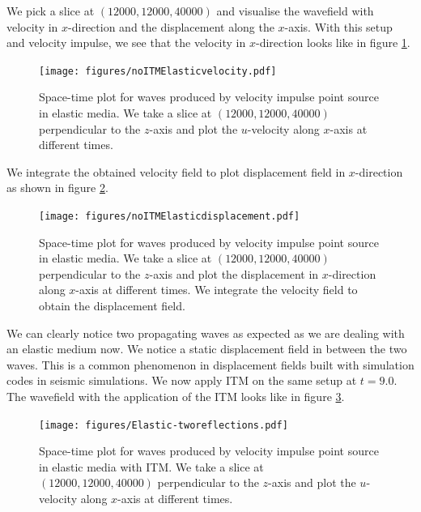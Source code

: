 We pick a slice at $\left(12000,12000,40000\right)$ and visualise the wavefield with velocity in $x$-direction and the displacement along the $x$-axis. With this setup and velocity impulse, 
we see that the velocity in $x$-direction looks like in figure \ref{fig:space-timeplot-elasticnoITM}.

\begin{figure}[htpb]
    \centering
    \texttt{[image: figures/noITMElasticvelocity.pdf]}
    \caption{Space-time plot for waves produced by velocity impulse point source in elastic media. We take a slice at $\left(12000,12000,40000\right)$ perpendicular to the $z$-axis
    and plot the $u$-velocity along $x$-axis at different times.}
    \label{fig:space-timeplot-elasticnoITM}
\end{figure}

We integrate the obtained velocity field to plot displacement field in $x$-direction as shown in figure \ref{fig:space-timeplot-elasticnoITMdisplacement}.

\begin{figure}[htpb]
    \centering
    \texttt{[image: figures/noITMElasticdisplacement.pdf]}
    \caption{Space-time plot for waves produced by velocity impulse point source in elastic media. We take a slice at $\left(12000,12000,40000\right)$ perpendicular to the $z$-axis
    and plot the displacement in $x$-direction along $x$-axis at different times. We integrate the velocity field to obtain the displacement field.}
    \label{fig:space-timeplot-elasticnoITMdisplacement}
\end{figure}

We can clearly notice two propagating waves as expected as we are dealing with an elastic medium now. We notice a static displacement field in between the two waves.
This is a common phenomenon in displacement fields built with simulation codes in seismic simulations. 
We now apply \ac{ITM} on the same setup at $t=9.0$. The wavefield with the application of the \ac{ITM} looks like in figure \ref{fig:space-timeplot-elasticITM}.

\begin{figure}[htpb]
    \centering
    \texttt{[image: figures/Elastic-tworeflections.pdf]}
    \caption{Space-time plot for waves produced by velocity impulse point source in elastic media with \ac{ITM}. We take a slice at $\left(12000,12000,40000\right)$ perpendicular to the $z$-axis
    and plot the $u$-velocity along $x$-axis at different times.}
    \label{fig:space-timeplot-elasticITM}
\end{figure}

